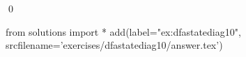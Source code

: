 
\begin{ex} 
  \label{ex:dfastatediag10}
  
  \qed
\end{ex} 
\begin{python0}
from solutions import *
add(label="ex:dfastatediag10",
    srcfilename='exercises/dfastatediag10/answer.tex') 
\end{python0}
